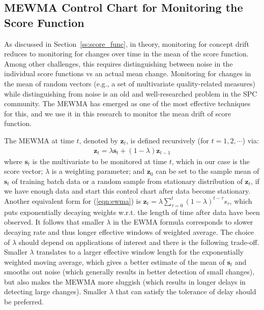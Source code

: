 \documentclass[twoside,11pt]{article}
\begin{document}
\subsection{MEWMA Control Chart for Monitoring the Score Function}
\label{ss:MEWMA}
%

As discussed in Section~\ref{ss:score_func}, in theory, monitoring for concept drift reduces to monitoring for changes over time in the mean of the score function. Among other challenges, this requires distinguishing between noise in the individual score functions vs an actual mean change. Monitoring for changes in the mean of random vectors (e.g., a set of multivariate quality-related measures) while distinguishing from noise is an old and well-researched problem in the SPC community. The MEWMA has emerged as one of the most effective techniques for this, and we use it in this research to monitor the mean drift of score function.

The MEWMA at time $t$, denoted by $\bm{z}_t$, is defined recursively (for $t=1,2,\cdots$) via:
\begin{align}
\bm {z}_t = \lambda \bm {s}_t + (1 - \lambda) \bm {z} _{t-1}
\label{eqn:ewma}
\end{align}
where $\bm {s}_t$ is the {multivariate} to be monitored at time $t$, which in our case is the score vector; $ \lambda$ is a weighting parameter; and $\bm{z}_0$ can be set to the sample mean of $\bm {s}_t$ of training batch data or a random sample from stationary distribution of $\bm {z}_t$, if we have enough data and start this control chart after data become stationary. Another equivalent form for (\ref{eqn:ewma}) is $\bm {z}_t = \lambda\sum _{\tau=0}^t (1-\lambda) ^{t-\tau} s _{\tau}$, which puts exponentially decaying weights w.r.t. the length of time after data have been observed. It follows that smaller $\lambda$ in the EWMA formula corresponds to slower decaying rate and thus longer effective windows of weighted average. The choice of $\lambda$ should depend on applications of interest and there is the following trade-off. Smaller $\lambda$ translates to a larger effective window length for the exponentially weighted moving average, which gives a better estimate of the mean of $\bm{s}_t$ and smooths out noise (which generally results in better detection of small changes), but also makes the MEWMA more sluggish (which results in longer delays in detecting large changes). Smaller $\lambda$ that can satisfy the tolerance of delay should be preferred.
\end{document}

